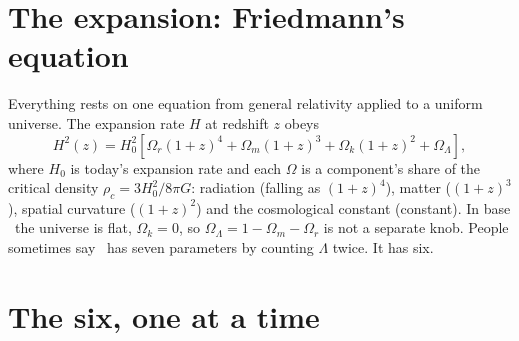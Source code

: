 \section{The expansion: Friedmann's equation}

Everything rests on one equation from general relativity applied to a uniform universe. The expansion rate $H$ at redshift $z$ obeys
\begin{equation}
H^2(z)=H_0^2\left[\Omega_r(1+z)^4+\Omega_m(1+z)^3+\Omega_k(1+z)^2+\Omega_\Lambda\right],
\end{equation}
where $H_0$ is today's expansion rate and each $\Omega$ is a component's share of the critical density $\rho_c=3H_0^2/8\pi G$: radiation (falling as $(1+z)^4$), matter ($(1+z)^3$), spatial curvature ($(1+z)^2$) and the cosmological constant (constant). In base \LCDM\ the universe is flat, $\Omega_k=0$, so $\Omega_\Lambda=1-\Omega_m-\Omega_r$ is not a separate knob. People sometimes say \LCDM\ has seven parameters by counting $\Lambda$ twice. It has six.



\section{The six, one at a time}

